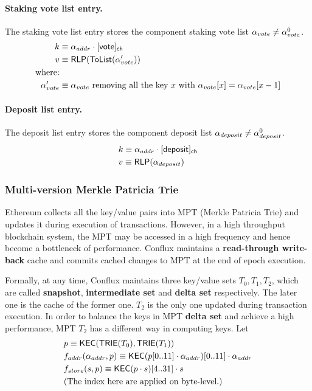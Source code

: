 \paragraph{Staking vote list entry.} The staking vote list entry stores the component staking vote list $\mathbf{\alpha}_{vote}\neq  \mathbf{\alpha}^0_{vote}$. 
\begin{align}
	k&\equiv \alpha_{addr}\cdot [{\sf vote}]_{\sf ch}  \\
	v&\equiv \mathsf{RLP}(\mathsf{ToList}(\mathbf{\alpha}'_{vote}))\\
	\mbox{where:}&\notag\\ 
	\mathbf{\alpha}'_{vote} &\equiv \mbox{$\mathbf{\alpha}_{vote}$ removing all the key $x$ with $\mathbf{\alpha}_{vote}[x]=\mathbf{\alpha}_{vote}[x-1]$}
\end{align}

\paragraph{Deposit list entry.} The deposit list entry stores the component deposit list $\mathbf{\alpha}_{deposit}\neq  \mathbf{\alpha}^0_{deposit}$. 
\begin{align}
	&k\equiv \alpha_{addr}\cdot [{\sf deposit}]_{\sf ch}  \\
	&v\equiv \mathsf{RLP}(\mathbf{\alpha}_{deposit})
\end{align}

\subsubsection{Multi-version Merkle Patricia Trie}

Ethereum collects all the key/value pairs into MPT (Merkle Patricia Trie) and updates it during execution of transactions. However, in a high throughput blockchain system, the MPT may be accessed in a high frequency and hence become a bottleneck of performance. Conflux maintains a \textbf{read-through write-back} cache and commits cached changes to MPT at the end of epoch execution. 

Formally, at any time, Conflux maintains three key/value sets $T_0,T_1,T_2$, which are called {\bf snapshot}, {\bf intermediate set} and {\bf delta set} respectively. The later one is the cache of the former one. $T_2$ is the only one updated during transaction execution. In order to balance the keys in MPT {\bf delta set} and achieve a high performance, MPT $T_2$ has a different way in computing keys. Let 
%
\begin{align}
	&p\equiv\mathsf{KEC}(\mathsf{TRIE}(T_0),\mathsf{TRIE}(T_1)) \\
	&f_{addr}(\alpha_{addr},p)\equiv\mathsf{KEC}(p[0..11]\cdot \alpha_{addr})[0..11]\cdot \alpha_{addr} \\ 
	&f_{store}(s,p)\equiv \mathsf{KEC}(p\cdot s)[4..31]\cdot s\\
	&\text{(The index here are applied on byte-level.)} \notag
\end{align}


